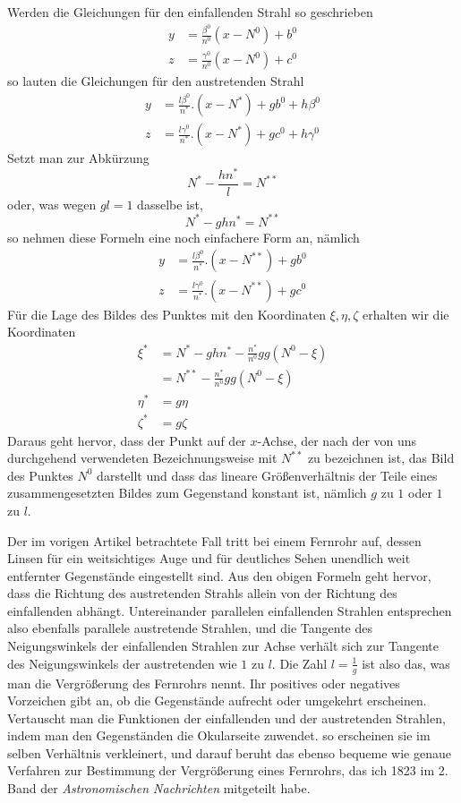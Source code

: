 Werden die Gleichungen für den einfallenden Strahl so geschrieben
\[
\begin{aligned}
y&=\frac{\beta^0}{n^0}(x-N^0)+b^0\\
z&=\frac{\gamma^0}{n^0}(x-N^0)+c^0
\end{aligned}
\]
so lauten die Gleichungen für den austretenden Strahl
\[
\begin{aligned}
y&=\frac{l\beta^0}{n^*}.(x-N^*)+gb^0+h\beta^0\\
z&=\frac{l\gamma^0}{n^*}.(x-N^*)+gc^0+h\gamma^0
\end{aligned}
\]
Setzt man zur Abkürzung
\[
N^*-\frac{hn^*}{l}=N^{**}
\]
oder, was wegen $gl=1$ dasselbe ist,
\[
N^*-ghn^*=N^{**}
\]
so nehmen diese Formeln eine noch einfachere Form an, nämlich
\[
\begin{aligned}
y&=\frac{l\beta^0}{n^*}.(x-N^{**})+gb^0\\
z&=\frac{l\gamma^0}{n^*}.(x-N^{**})+gc^0
\end{aligned}
\]
Für die Lage des Bildes des Punktes mit den Koordinaten $\xi,\eta,\zeta$ erhalten wir die Koordinaten
\[
\begin{aligned}
\xi^*&=N^*-ghn^*-\frac{n^*}{n^0}gg(N^0-\xi)\\
&=N^{**}-\frac{n^*}{n^0}gg(N^0-\xi)\\
\eta^*&=g\eta\\
\zeta^*&=g\zeta
\end{aligned}
\]
Daraus geht hervor, dass der Punkt auf der $x$-Achse, der nach der von uns durchgehend verwendeten Bezeichnungsweise mit $N^{**}$ zu bezeichnen ist, das Bild des Punktes $N^0$ darstellt und dass das lineare Größenverhältnis der Teile eines zusammengesetzten Bildes zum Gegenstand konstant ist, nämlich $g$ zu $1$ oder $1$ zu $l$.

Der im vorigen Artikel betrachtete Fall tritt bei einem Fernrohr auf, dessen Linsen für ein weitsichtiges Auge und für deutliches Sehen unendlich weit entfernter Gegenstände eingestellt sind. Aus den obigen Formeln geht hervor, dass die Richtung des austretenden Strahls allein von der Richtung des einfallenden abhängt. Untereinander parallelen einfallenden Strahlen entsprechen also ebenfalls parallele austretende Strahlen, und die Tangente des Neigungswinkels der einfallenden Strahlen zur Achse verhält sich zur Tangente des Neigungswinkels der austretenden wie $1$ zu $l$. Die Zahl $l=\frac1g$ ist also das, was man die Vergrößerung des Fernrohrs nennt. Ihr positives oder negatives Vorzeichen gibt an, ob die Gegenstände aufrecht oder umgekehrt erscheinen. Vertauscht man die Funktionen der einfallenden und der austretenden Strahlen, indem man den Gegenständen die Okularseite zuwendet. so erscheinen sie im selben Verhältnis verkleinert, und darauf beruht das ebenso bequeme wie genaue Verfahren zur Bestimmung der Vergrößerung eines Fernrohrs, das ich 1823 im 2. Band der \textit{Astronomischen Nachrichten} mitgeteilt habe.

